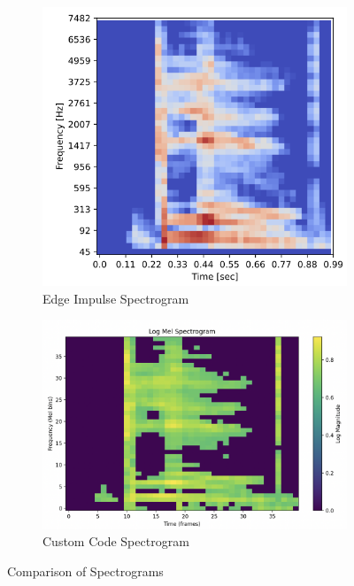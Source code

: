 \begin{figure}[!h]
    \centering
    \begin{subfigure}[t]{0.4\textwidth}
        \centering
        \includegraphics[width=\textwidth]{images/4.02 Spectrogram Edge Impulse.png}
        \caption{Edge Impulse Spectrogram}
        \label{fig:edgeimpulsespectrogram}
    \end{subfigure}
    \hfill
    \begin{subfigure}[t]{0.5\textwidth}
        \centering
        \includegraphics[width=\textwidth]{images/4.03 Spectrogram My Code.png}
        \caption{Custom Code Spectrogram}
        \label{fig:myspectrogram}
    \end{subfigure}
    \caption{Comparison of Spectrograms}
\end{figure}

